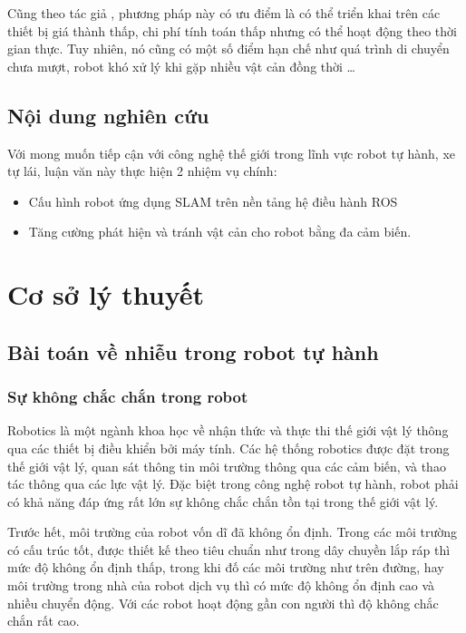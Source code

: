 Cũng theo tác giả \cite{Susnea2010}, phương pháp này có ưu điểm là có thể triển khai trên các thiết bị giá thành thấp, chi phí tính toán thấp nhưng có thể hoạt động theo thời gian thực. Tuy nhiên, nó cũng có một số điểm hạn chế như quá trình di chuyển chưa mượt, robot khó xử lý khi gặp nhiều vật cản đồng thời \dots




\section{Nội dung nghiên cứu}


Với mong muốn tiếp cận với công nghệ thế giới trong lĩnh vực robot tự hành, xe tự lái, luận văn này thực hiện 2 nhiệm vụ chính:
\begin{itemize}
  \item Cấu hình robot ứng dụng SLAM trên nền tảng hệ điều hành ROS
  \item Tăng cường phát hiện và tránh vật cản cho robot bằng đa cảm biến.
\end{itemize}

\chapter{Cơ sở lý thuyết}
\label{chap:1cslt}
\section{Bài toán về nhiễu trong robot tự hành} \label{sec:2.1}
\subsection{Sự không chắc chắn trong robot}
Robotics là một ngành khoa học về nhận thức và thực thi thế giới vật lý thông qua các thiết bị điều khiển bởi máy tính. Các hệ thống robotics được đặt trong thế giới vật lý, quan sát thông tin môi trường thông qua các cảm biến, và thao tác thông qua các lực vật lý. Đặc biệt trong công nghệ robot tự hành, robot phải có khả năng đáp ứng rất lớn sự không chắc chắn tồn tại trong thế giới vật lý.

Trước hết, môi trường của robot vốn dĩ đã không ổn định. Trong các môi trường có cấu trúc tốt, được thiết kế theo tiêu chuẩn như trong dây chuyền lắp ráp thì mức độ không ổn định thấp, trong khi đố các môi trường như trên đường, hay môi trường trong nhà của robot dịch vụ thì có mức độ không ổn định cao và nhiều chuyển động. Với các robot hoạt động gần con người thì độ không chắc chắn rất cao.


